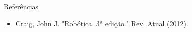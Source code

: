 \documentclass{beamer}
\begin{document}
\begin{frame}[t]{Referências}
    \begin{itemize}
        \item Craig, John J. "Robótica. 3ª edição." Rev. Atual (2012).


\end{itemize}
\end{frame}
\end{document}
